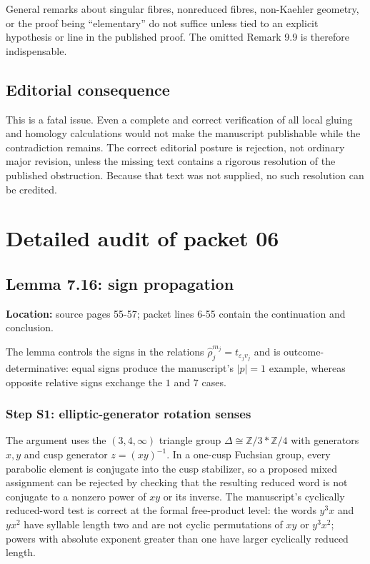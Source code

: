 \documentclass[
  10pt,
]{article}
\begin{document}
General remarks about singular fibres, nonreduced fibres, non-Kaehler
geometry, or the proof being ``elementary'' do not suffice unless tied
to an explicit hypothesis or line in the published proof. The omitted
Remark 9.9 is therefore indispensable.

\subsection{Editorial consequence}\label{editorial-consequence}

This is a fatal issue. Even a complete and correct verification of all
local gluing and homology calculations would not make the manuscript
publishable while the contradiction remains. The correct editorial
posture is rejection, not ordinary major revision, unless the missing
text contains a rigorous resolution of the published obstruction.
Because that text was not supplied, no such resolution can be credited.

\section{Detailed audit of packet 06}\label{detailed-audit-of-packet-06}

\subsection{Lemma 7.16: sign
propagation}\label{lemma-7.16-sign-propagation}

\textbf{Location:} source pages 55-57; packet lines 6-55 contain the
continuation and conclusion.

The lemma controls the signs in the relations
\(\widehat\rho_j^{m_j}=t_{\varepsilon_jv_j}\) and is
outcome-determinative: equal signs produce the manuscript's \(|p|=1\)
example, whereas opposite relative signs exchange the \(1\) and \(7\)
cases.

\subsubsection{Step S1: elliptic-generator rotation
senses}\label{step-s1-elliptic-generator-rotation-senses}

The argument uses the \((3,4,\infty)\) triangle group
\(\Delta\cong\mathbb Z/3*\mathbb Z/4\) with generators \(x,y\) and cusp
generator \(z=(xy)^{-1}\). In a one-cusp Fuchsian group, every parabolic
element is conjugate into the cusp stabilizer, so a proposed mixed
assignment can be rejected by checking that the resulting reduced word
is not conjugate to a nonzero power of \(xy\) or its inverse. The
manuscript's cyclically reduced-word test is correct at the formal
free-product level: the words \(y^3x\) and \(yx^2\) have syllable length
two and are not cyclic permutations of \(xy\) or \(y^3x^2\); powers with
absolute exponent greater than one have larger cyclically reduced
length.
\end{document}

